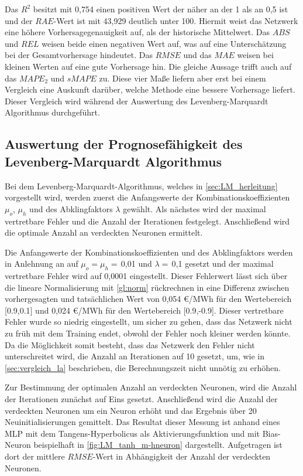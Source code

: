 Das $R^2$ besitzt mit 0,754 einen positiven Wert der näher an der 1 als an 0,5 ist und der $RAE$-Wert ist mit 43,929 deutlich unter 100. Hiermit weist das Netzwerk eine höhere Vorhersagegenauigkeit auf, als der historische Mittelwert. Das $ABS$ und $REL$ weisen beide einen negativen Wert auf, was auf eine Unterschätzung bei der Gesamtvorhersage hindeutet. Das $RMSE$ und das $MAE$ weisen bei kleinen Werten auf eine gute Vorhersage hin. Die gleiche Aussage trifft auch auf das $MAPE_2$ und $sMAPE$ zu. Diese vier Maße liefern aber erst bei einem Vergleich eine Auskunft darüber, welche Methode eine bessere Vorhersage liefert. Dieser Vergleich wird während der Auswertung des Levenberg-Marquardt Algorithmus durchgeführt.







\newpage

\subsection{Auswertung der Prognosefähigkeit des Levenberg-Marquardt Algorithmus}\label{sec:aus_LM}

Bei dem Levenberg-Marquardt-Algorithmus, welches in \autoref{sec:LM_herleitung} vorgestellt wird, werden zuerst die Anfangswerte der Kombinationskoeffizienten $\mu_o$, $\mu_h$ und des Abklingfaktors $\lambda$ gewählt. Als nächstes wird der maximal vertretbare Fehler und die Anzahl der Iterationen festgelegt. Anschließend wird die optimale Anzahl an verdeckten Neuronen ermittelt.

Die Anfangswerte der Kombinationskoeffizienten und des Abklingfaktors werden in Anlehnung an \citet{Kwak2012} auf $\mu_o=\mu_h=$\,0,01 und $\lambda=$\,0,1 gesetzt und der maximal vertretbare Fehler wird auf 0,0001 eingestellt. Dieser Fehlerwert lässt sich über die lineare Normalisierung mit \autoref{gl:norm} rückrechnen in eine Differenz zwischen vorhergesagten und tatsächlichen Wert von 0,054 €/MWh für den Wertebereich [0.9,0.1] und 0,024 €/MWh für den Wertebereich [0.9,-0.9]. Dieser vertretbare Fehler wurde so niedrig eingestellt, um sicher zu gehen, dass das Netzwerk nicht zu früh mit dem Training endet, obwohl der Fehler noch kleiner werden könnte. Da die Möglichkeit somit besteht, dass das Netzwerk den Fehler nicht unterschreitet wird, die Anzahl an Iterationen auf 10 gesetzt, um, wie in \autoref{sec:vergleich_la} beschrieben, die Berechnungszeit nicht unnötig zu erhöhen. 

Zur Bestimmung der optimalen Anzahl an verdeckten Neuronen, wird die Anzahl der Iterationen zunächst auf Eins gesetzt. Anschließend wird die Anzahl der verdeckten Neuronen um ein Neuron erhöht und das Ergebnis über 20 Neuinitialisierungen gemittelt. Das Resultat dieser Messung ist anhand eines MLP mit dem Tangens-Hyperbolicus als Aktivierungsfunktion und mit Bias-Neuron beispielhaft in \autoref{fig:LM_tanh_m-hneuron} dargestellt. Aufgetragen ist dort der mittlere $RMSE$-Wert in Abhängigkeit der Anzahl der verdeckten Neuronen.

